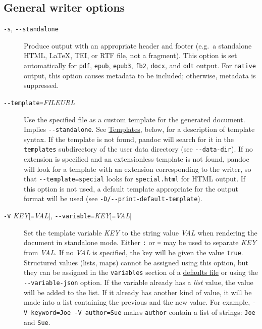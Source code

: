 \documentclass[
]{article}
\begin{document}
\hypertarget{general-writer-options}{%
\subsection{General writer options}\label{general-writer-options}}

\begin{description}
\item[\texttt{-s}, \texttt{-\/-standalone}]
Produce output with an appropriate header and footer (e.g.~a standalone
HTML, LaTeX, TEI, or RTF file, not a fragment). This option is set
automatically for \texttt{pdf}, \texttt{epub}, \texttt{epub3},
\texttt{fb2}, \texttt{docx}, and \texttt{odt} output. For
\texttt{native} output, this option causes metadata to be included;
otherwise, metadata is suppressed.
\item[\texttt{-\/-template=}\emph{FILE}\textbar{}\emph{URL}]
Use the specified file as a custom template for the generated document.
Implies \texttt{-\/-standalone}. See
\protect\hyperlink{templates}{Templates}, below, for a description of
template syntax. If the template is not found, pandoc will search for it
in the \texttt{templates} subdirectory of the user data directory (see
\texttt{-\/-data-dir}). If no extension is specified and an
extensionless template is not found, pandoc will look for a template
with an extension corresponding to the writer, so that
\texttt{-\/-template=special} looks for \texttt{special.html} for HTML
output. If this option is not used, a default template appropriate for
the output format will be used (see
\texttt{-D/-\/-print-default-template}).
\item[\texttt{-V} \emph{KEY}{[}\texttt{=}\emph{VAL}{]},
\texttt{-\/-variable=}\emph{KEY}{[}\texttt{=}\emph{VAL}{]}]
Set the template variable \emph{KEY} to the string value \emph{VAL} when
rendering the document in standalone mode. Either \texttt{:} or
\texttt{=} may be used to separate \emph{KEY} from \emph{VAL}. If no
\emph{VAL} is specified, the key will be given the value \texttt{true}.
Structured values (lists, maps) cannot be assigned using this option,
but they can be assigned in the \texttt{variables} section of a
\protect\hyperlink{defaults-files}{defaults file} or using the
\texttt{-\/-variable-json} option. If the variable already has a
\emph{list} value, the value will be added to the list. If it already
has another kind of value, it will be made into a list containing the
previous and the new value. For example,
\texttt{-V\ keyword=Joe\ -V\ author=Sue} makes \texttt{author} contain a
list of strings: \texttt{Joe} and \texttt{Sue}.

\end{description}
\end{document}
